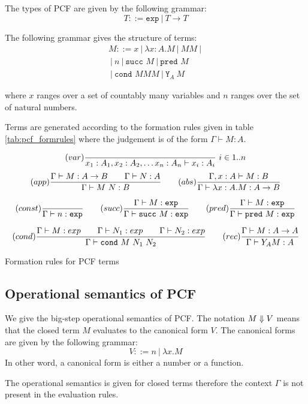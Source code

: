 The types of PCF are given by the following grammar:
$$ T ::= \texttt{exp}\ |\ T \rightarrow T$$

The following grammar gives the structure of terms:
\begin{eqnarray*}
 M ::= x\ |\ \lambda x :A . M \ |\ M M \ |\ \\
\ |\ n \ |\ \texttt{succ } M \ |\  \texttt{pred } M \\
\ |\ \texttt{cond } M M M \ |\ \texttt{Y}_A\ M
\end{eqnarray*}

where $x$ ranges over a set of countably many variables and $n$
ranges over the set of natural numbers.

Terms are generated according to the formation rules given in table
\ref{tab:pcf_formrules} where the judgement is of the form $ \Gamma  \vdash M : A$.

\begin{table}[htbp]
$$ (var) \frac{\displaystyle }{x_1:A_1, x_2:A_2, \ldots x_n : A_n  \vdash x_i : A_i}\ i \in 1..n$$
$$ (app) \frac{\displaystyle \Gamma \vdash M : A\rightarrow B \qquad \Gamma \vdash N:A}{\Gamma \vdash M\ N : B}
\qquad (abs) \frac{\displaystyle \Gamma, x:A \vdash M : B}{\Gamma \vdash \lambda x :A . M : A\rightarrow B}$$

$$ (const) \frac{\displaystyle }{\Gamma \vdash n :\texttt{exp}}
\qquad (succ) \frac{\displaystyle \Gamma \vdash M:\texttt{exp} }{\Gamma \vdash \texttt{succ}\ M:\texttt{exp}}
\qquad (pred) \frac{\displaystyle \Gamma \vdash M:\texttt{exp} }{\Gamma \vdash \texttt{pred}\ M:\texttt{exp}}$$

$$
(cond) \frac{\displaystyle \Gamma \vdash M : exp \qquad \Gamma \vdash N_1 : exp \qquad \Gamma \vdash N_2 : exp }{\Gamma \vdash \texttt{cond}\ M\ N_1\ N_2}
\qquad  (rec) \frac{\displaystyle \Gamma \vdash M : A\rightarrow A }{ \Gamma \vdash Y_A M : A}$$

\caption{Formation rules for PCF terms}
\label{tab:pcf_formrules}
\end{table}

\subsection{Operational semantics of PCF}

We give the big-step operational semantics of PCF. The notation $M \Downarrow V$ means
that the closed term $M$ evaluates to the canonical form $V$. The canonical forms are given by the following
grammar:
$$V ::= n\ |\ \lambda x. M$$
In other word, a canonical form is either a number or a function.

The operational semantics is given for closed terms therefore the context $\Gamma$ is not present in
the evaluation rules.

